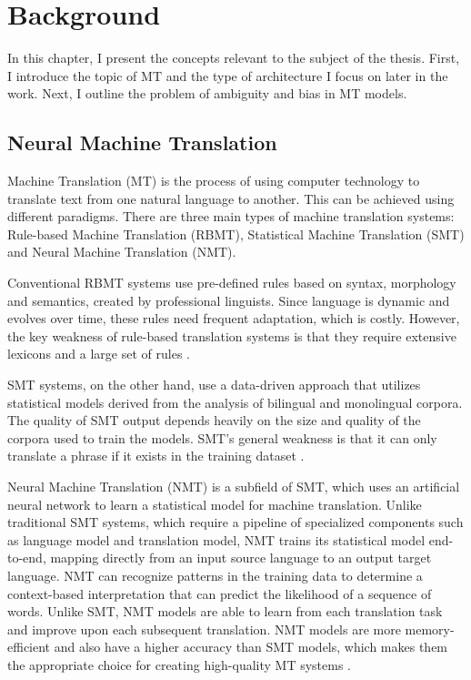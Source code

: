 \chapter{Background}
\label{ch:Background}

In this chapter, I present the concepts relevant to the subject of the thesis. First, I introduce the topic of MT and the type of architecture I focus on later in the work. Next, I outline the problem of ambiguity and bias in MT models.


\section{Neural Machine Translation}
\label{sec:Background:NMT}

Machine Translation (MT) is the process of using computer technology to translate text from one natural language to another. This can be achieved using different paradigms. There are three main types of machine translation systems: Rule-based Machine Translation (RBMT), Statistical Machine Translation (SMT) and Neural Machine Translation (NMT). 

Conventional RBMT systems use pre-defined rules based on syntax, morphology and semantics, created by professional linguists. Since language is dynamic and evolves over time, these rules need frequent adaptation, which is costly. However, the key weakness of rule-based translation systems is that they require extensive lexicons and a large set of rules \parencite{SMT_book}. 

SMT systems, on the other hand, use a data-driven approach that utilizes statistical models derived from the analysis of bilingual and monolingual corpora. The quality of SMT output depends heavily on the size and quality of the corpora used to train the models. SMT’s general weakness is that it can only translate a phrase if it exists in the training dataset \parencite{SMT_book}.

Neural Machine Translation (NMT) is a subfield of SMT, which uses an artificial neural network to learn a statistical model for machine translation. Unlike traditional SMT systems, which require a pipeline of specialized components such as language model and translation model, NMT trains its statistical model end-to-end, mapping directly from an input source language to an output target language. NMT can recognize patterns in the training data to determine a context-based interpretation that can predict the likelihood of a sequence of words. Unlike SMT, NMT models are able to learn from each translation task and improve upon each subsequent translation. NMT models are more memory-efficient and also have a higher accuracy than SMT models, which makes them the appropriate choice for creating high-quality MT systems \parencite{NMT_book}.


